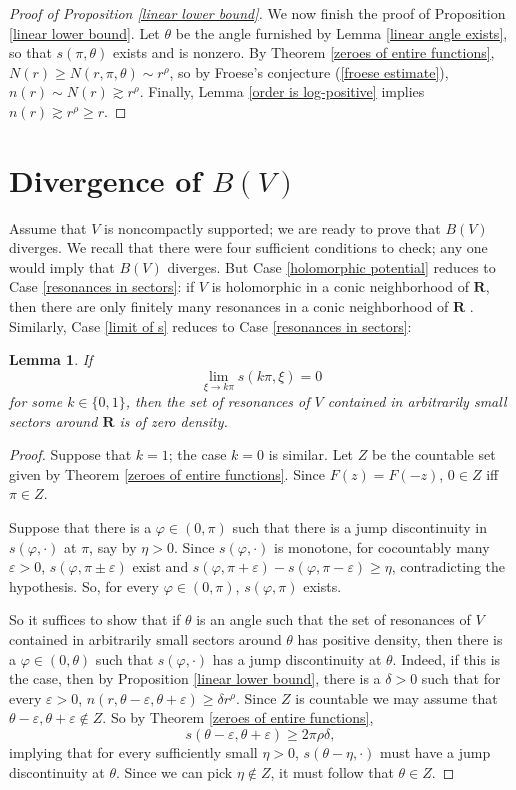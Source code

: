 \documentclass[reqno,12pt,letterpaper]{amsart}
\newcommand{\RR}{\mathbf{R}}
\newtheorem{lemma}[theorem]{Lemma}
\theoremstyle{definition}
\begin{document}
\begin{proof}[Proof of Proposition \ref{linear lower bound}]
We now finish the proof of Proposition \ref{linear lower bound}. Let $\theta$ be the angle furnished by Lemma \ref{linear angle exists}, so that $s(\pi, \theta)$ exists and is nonzero.
By Theorem \ref{zeroes of entire functions}, $N(r) \geq N(r, \pi, \theta) \sim r^\rho$, so by Froese's conjecture (\ref{froese estimate}), $n(r) \sim N(r) \gtrsim r^\rho$.
Finally, Lemma \ref{order is log-positive} implies $n(r) \gtrsim r^\rho \geq r$.
\end{proof}

\section{Divergence of $B(V)$}
\label{divergence section}
Assume that $V$ is noncompactly supported; we are ready to prove that $B(V)$ diverges. We recall that there were four sufficient conditions to check; any one would imply that $B(V)$ diverges. But Case \ref{holomorphic potential} reduces to Case \ref{resonances in sectors}: if $V$ is holomorphic in a conic neighborhood of $\RR$, then there are only finitely many resonances in a conic neighborhood of $\RR$ \cite[Corollary 12.14]{sjostrand2002lectures}.
Similarly, Case \ref{limit of s} reduces to Case \ref{resonances in sectors}:
\begin{lemma}
If
$$\lim_{\xi \to k\pi} s(k\pi, \xi) = 0$$
for some $k \in \{0, 1\}$, then the set of resonances of $V$ contained in arbitrarily small sectors around $\RR$ is of zero density.
\end{lemma}
\begin{proof}
Suppose that $k = 1$; the case $k = 0$ is similar.
Let $Z$ be the countable set given by Theorem \ref{zeroes of entire functions}. Since $F(z) = F(-z)$, $0 \in Z$ iff $\pi \in Z$.

Suppose that there is a $\varphi \in (0, \pi)$ such that there is a jump discontinuity in $s(\varphi, \cdot)$ at $\pi$, say by $\eta > 0$. Since $s(\varphi, \cdot)$ is monotone, for cocountably many $\varepsilon > 0$, $s(\varphi, \pi \pm \varepsilon)$ exist and $s(\varphi, \pi + \varepsilon) - s(\varphi, \pi - \varepsilon) \geq \eta$, contradicting the hypothesis.
So, for every $\varphi \in (0, \pi)$, $s(\varphi, \pi)$ exists.

So it suffices to show that if $\theta$ is an angle such that the set of resonances of $V$ contained in arbitrarily small sectors around $\theta$ has positive density, then there is a $\varphi \in (0, \theta)$ such that $s(\varphi, \cdot)$ has a jump discontinuity at $\theta$.
Indeed, if this is the case, then by Proposition \ref{linear lower bound}, there is a $\delta > 0$ such that for every $\varepsilon > 0$, $n(r, \theta - \varepsilon, \theta + \varepsilon) \geq \delta r^\rho$.
Since $Z$ is countable we may assume that $\theta - \varepsilon, \theta + \varepsilon \notin Z$. So by Theorem \ref{zeroes of entire functions},
$$s(\theta - \varepsilon, \theta + \varepsilon) \geq 2\pi \rho \delta,$$
implying that for every sufficiently small $\eta > 0$, $s(\theta - \eta, \cdot)$ must have a jump discontinuity at $\theta$.
Since we can pick $\eta \notin Z$, it must follow that $\theta \in Z$.
\end{proof}
\end{document}
